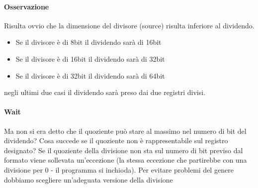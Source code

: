 \documentclass[11pt]{report}
\begin{document}
\paragraph{Osservazione} Risulta ovvio che la dimensione del divisore (source) risulta inferiore al dividendo. 
\begin{itemize}
\item Se il divisore è di 8bit il dividendo sarà di 16bit
\item Se il divisore è di 16bit il dividendo sarà di 32bit
\item Se il divisore è di 32bit il dividendo sarà di 64bit
\end{itemize}
negli ultimi due casi il dividendo sarà preso dai due registri divisi.
\paragraph{Wait} Ma non si era detto che il quoziente può stare al massimo nel numero di bit del dividendo? Cosa succede se il quoziente non è rappresentabile sul registro designato? Se il quoziente della divisione non sta sul numero di bit previso dal formato viene sollevata un'eccezione (la stessa eccezione che partirebbe con una divisione per 0 - il programma si inchioda). Per evitare problemi del genere dobbiamo scegliere un'adeguata versione della divisione
\end{document}
